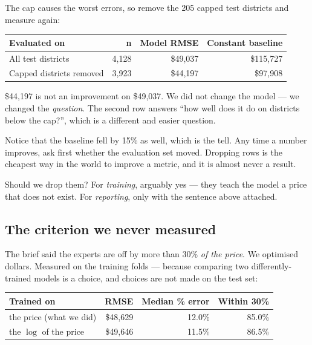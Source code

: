 \documentclass[11pt,a4paper]{article}
\begin{document}
The cap causes the worst errors, so remove the 205 capped test districts and
measure again:

\begin{center}
\small
\begin{tabular}{lrrr}
\toprule
\textbf{Evaluated on} & \textbf{n} & \textbf{Model RMSE} &
\textbf{Constant baseline} \\
\midrule
All test districts     & 4{,}128 & \$49{,}037 & \$115{,}727 \\
Capped districts removed & 3{,}923 & \$44{,}197 & \$97{,}908 \\
\bottomrule
\end{tabular}
\end{center}

\begin{failbox}[title={Failure condition --- these two numbers cannot be compared}]
\$44{,}197 is not an improvement on \$49{,}037. We did not change the model ---
we changed the \emph{question}. The second row answers ``how well does it do on
districts below the cap?'', which is a different and easier question.

Notice that the baseline fell by 15\% as well, which is the tell. Any time a
number improves, ask first whether the evaluation set moved. Dropping rows is
the cheapest way in the world to improve a metric, and it is almost never a
result.
\end{failbox}

Should we drop them? For \emph{training}, arguably yes --- they teach the model
a price that does not exist. For \emph{reporting}, only with the sentence above
attached.

\subsection{The criterion we never measured}

The brief said the experts are off by more than 30\% \emph{of the price}. We
optimised dollars. Measured on the training folds --- because comparing two
differently-trained models is a choice, and choices are not made on the test
set:

\begin{center}
\small
\begin{tabular}{lrrr}
\toprule
\textbf{Trained on} & \textbf{RMSE} & \textbf{Median \% error} &
\textbf{Within 30\%} \\
\midrule
the price (what we did) & \$48{,}629 & 12.0\% & 85.0\% \\
the $\log$ of the price & \$49{,}646 & 11.5\% & 86.5\% \\
\bottomrule
\end{tabular}
\end{center}
\end{document}
